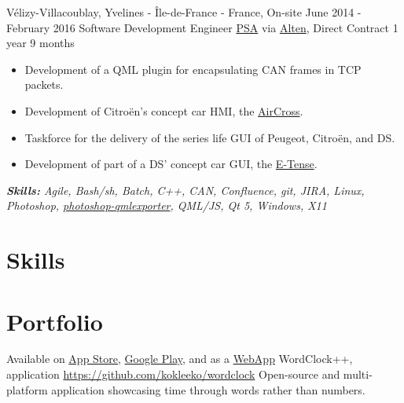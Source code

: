 \documentclass[11pt,a4paper,roman]{moderncv}
\begin{document}
\cventry
{Vélizy-Villacoublay, Yvelines - Île-de-France - France, On-site}
{June 2014 - February 2016}
{Software Development Engineer}
{\href{https://www.groupe-psa.com/en/}{PSA} via \href{https://www.alten.com}{Alten}, Direct Contract}
{1 year 9 months}
{}
{
\begin{itemize}
	\item Development of a QML plugin for encapsulating CAN frames in TCP packets.
	\item Development of Citroën's concept car HMI, the
	\href{https://www.media.stellantis.com/em-en/citroen/press/new-citroen-aircross-concept-car-an-invitation-to-travel-citroen-style}{AirCross}.
\item Taskforce for the delivery of the series life GUI of Peugeot, Citroën, and DS.
\item Development of part of a DS' concept car GUI, the \href{https://www.dsautomobiles.co.uk/ds-experience/concept-cars/ds-e-tense-performance.html}{E-Tense}.
\end{itemize}
{\textcolor{color2}{\textit{\textbf{Skills:}
	Agile,
	Bash/sh,
	Batch,
	C++,
	CAN,
	Confluence,
	git,
	JIRA,
	Linux,
	Photoshop,
	\href{https://github.com/qt-labs/photoshop-qmlexporter}{photoshop-qmlexporter},
	QML/JS,
	Qt 5,
	Windows,
	X11
}}}}

\section{Skills}


\section{Portfolio}

\cventry
{}
{Available on \href{https://apps.apple.com/us/app/wordclock/id1626068981}{App Store}, \href{https://play.google.com/store/apps/details?id=io.kokleeko.wordclock}{Google Play}, and as a \href{https://wordclock.kokleeko.io/}{WebApp}}
{WordClock++, application}
{\href{https://github.com/kokleeko/wordclock}{https://github.com/kokleeko/wordclock}}
{}
{Open-source and multi-platform application showcasing time through words rather than numbers.}
{}
\end{document}
